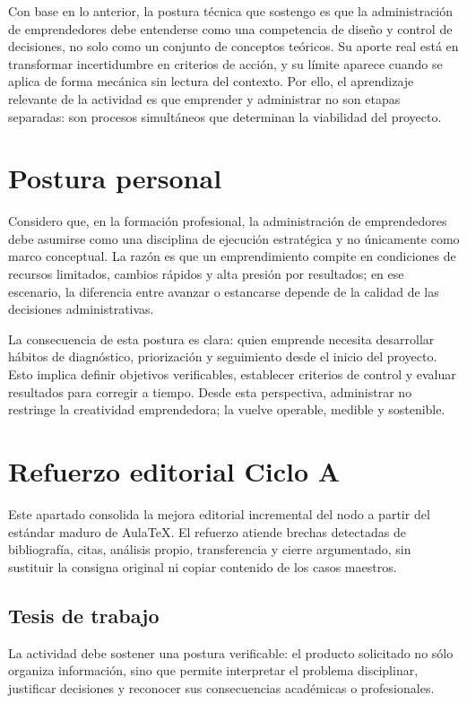 \documentclass[
	spanish,
	letterpaper, oneside
]{article}
\begin{document}
Con base en lo anterior, la postura técnica que sostengo es que la administración de emprendedores debe entenderse como una competencia de diseño y control de decisiones, no solo como un conjunto de conceptos teóricos. Su aporte real está en transformar incertidumbre en criterios de acción, y su límite aparece cuando se aplica de forma mecánica sin lectura del contexto. Por ello, el aprendizaje relevante de la actividad es que emprender y administrar no son etapas separadas: son procesos simultáneos que determinan la viabilidad del proyecto.

\section{Postura personal}

Considero que, en la formación profesional, la administración de emprendedores debe asumirse como una disciplina de ejecución estratégica y no únicamente como marco conceptual. La razón es que un emprendimiento compite en condiciones de recursos limitados, cambios rápidos y alta presión por resultados; en ese escenario, la diferencia entre avanzar o estancarse depende de la calidad de las decisiones administrativas.

La consecuencia de esta postura es clara: quien emprende necesita desarrollar hábitos de diagnóstico, priorización y seguimiento desde el inicio del proyecto. Esto implica definir objetivos verificables, establecer criterios de control y evaluar resultados para corregir a tiempo. Desde esta perspectiva, administrar no restringe la creatividad emprendedora; la vuelve operable, medible y sostenible.

\section*{Refuerzo editorial Ciclo A}
Este apartado consolida la mejora editorial incremental del nodo a partir del estándar maduro de AulaTeX. El refuerzo atiende brechas detectadas de bibliografía, citas, análisis propio, transferencia y cierre argumentado, sin sustituir la consigna original ni copiar contenido de los casos maestros.

\subsection*{Tesis de trabajo}
La actividad debe sostener una postura verificable: el producto solicitado no sólo organiza información, sino que permite interpretar el problema disciplinar, justificar decisiones y reconocer sus consecuencias académicas o profesionales.
\end{document}
